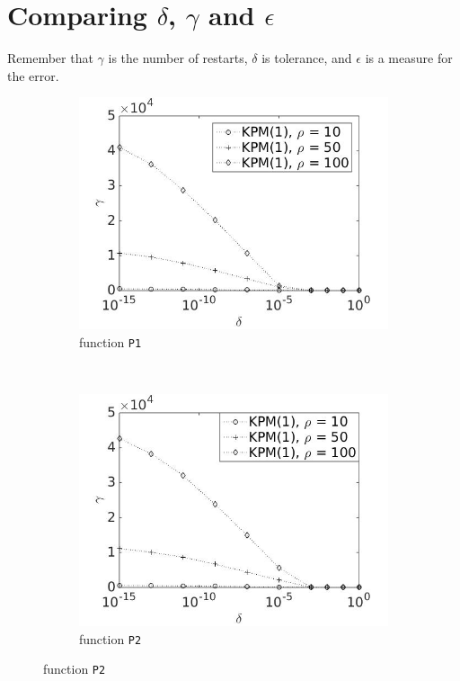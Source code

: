 \section{Comparing $\delta$, $\gamma$ and $\epsilon$ } \label{sec:div}
Remember that $\gamma$ is the number of restarts, $\delta$ is tolerance, and $\epsilon$ is a measure for the error.
\begin{figure}[H]
        \centering
        \begin{subfigure}[b]{0.45\textwidth}
                \includegraphics[width=\textwidth]{fig/s13antvstol1m}
                \caption{function \texttt{P1}}
                \label{fig:gammadelta1}
        \end{subfigure}
~
        \begin{subfigure}[b]{0.45\textwidth}
                \includegraphics[width=\textwidth]{fig/s14antvstol2m}
                \caption{ function \texttt{P2}}
                \label{fig:gammadelta2}
        \end{subfigure}
        

\end{figure}
